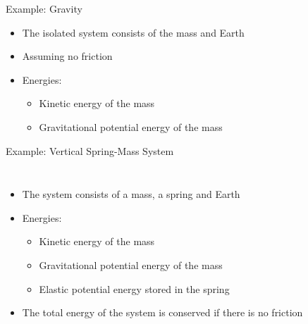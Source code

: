 \documentclass[12pt,compress,aspectratio=169]{beamer}
\newcommand{\mb}[1]{\ensuremath\mathbf{#1}}
\begin{document}
\begin{frame}{Example: Gravity}
  \begin{center}
  \end{center}
  
  \begin{itemize}
  \item The isolated system consists of the mass and Earth
  \item Assuming no friction
  \item Energies:
    \begin{itemize}
    \item Kinetic energy of the mass
    \item Gravitational potential energy of the mass
    \end{itemize}
  \end{itemize}
\end{frame}



\begin{frame}{Example: Vertical Spring-Mass System}
  \begin{columns}
    \begin{itemize}
    \item The system consists of a mass, a spring and Earth
    \item Energies:
      \begin{itemize}
      \item Kinetic energy of the mass
      \item Gravitational potential energy of the mass
      \item Elastic potential energy stored in the spring
      \end{itemize}
    \item The total energy of the system is conserved if there is no friction
    \end{itemize}
  \end{columns}
\end{frame}
\end{document}

